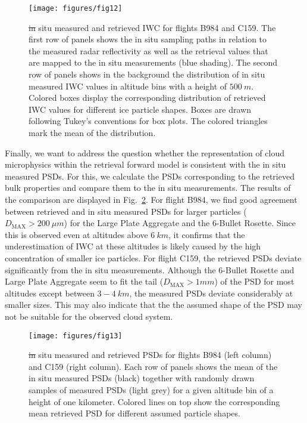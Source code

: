\documentclass[journal abbreviation, manuscript]{copernicus}
\providecommand{\DIFadd}[1]{{\protect\color{blue}\uwave{#1}}} %
\providecommand{\DIFdel}[1]{{\protect\color{red}\sout{#1}}}                      %
\providecommand{\DIFaddFL}[1]{\DIFadd{#1}} %
\providecommand{\DIFdelFL}[1]{\DIFdel{#1}} %
\providecommand{\DIFaddbeginFL}{} %
\providecommand{\DIFaddendFL}{} %
\providecommand{\DIFdelbeginFL}{} %
\providecommand{\DIFdelendFL}{} %
\begin{document}
\begin{figure}[!hbpt]
  \centering
  \texttt{[image: figures/fig12]}
  \caption{\DIFdelbeginFL \DIFdelFL{in }\DIFdelendFL \DIFaddbeginFL \DIFaddFL{In }\DIFaddendFL situ measured and retrieved IWC for flights B984 and C159. The
    first row of panels shows the in situ sampling paths in relation to the
    measured radar reflectivity as well as the retrieval values that are mapped
    to the in situ measurements (blue shading). The second row of panels shows
    in the background the distribution of in situ measured IWC values in
    altitude bins with a height of $500\ \unit{m}$. Colored boxes display the
    corresponding distribution of retrieved IWC values for different ice
    particle shapes. Boxes are drawn following Tukey's conventions for box
    plots. The colored triangles mark the mean of the distribution.}
  \label{fig:in_situ_iwc}
\end{figure}

Finally, we want to address the question whether the representation of cloud
microphysics within the retrieval forward model is consistent with the in situ
measured PSDs. For this, we calculate the PSDs corresponding to the retrieved
bulk properties and compare them to the in situ measurements. The results of the
comparison are displayed in Fig.~\ref{fig:in_situ_psds}. For flight B984, we
find good agreement between retrieved and in situ measured PSDs for larger
particles ($D_\text{MAX} > 200 \ \unit{\mu m}$) for the Large Plate Aggregate
and the 6-Bullet Rosette. Since this is observed even at altitudes above $6
\ \unit{km}$, it confirms that the underestimation of IWC at these altitudes is
likely caused by the high concentration of smaller ice particles. For flight
C159, the retrieved PSDs deviate significantly from the in situ measurements.
Although the 6-Bullet Rosette and Large Plate Aggregate seem to fit the tail
($D_\text{MAX} > 1 \unit{mm}$) of the PSD for most altitudes except between $3 -
4\ \unit{km}$, the measured PSDs deviate considerably at smaller sizes. This may
also indicate that the the assumed shape of the PSD may not be suitable for the
observed cloud system.

\begin{figure}[!hbpt]
  \centering
  \texttt{[image: figures/fig13]}
  \caption{\DIFdelbeginFL \DIFdelFL{in }\DIFdelendFL \DIFaddbeginFL \DIFaddFL{In }\DIFaddendFL situ measured and retrieved PSDs for flights B984 (left column)
    and C159 (right column). Each row of panels shows the mean of the
    in situ measured PSDs (black) together with randomly drawn samples of
    measured PSDs (light grey) for a given altitude bin of a height of one
    kilometer. Colored lines on top show the corresponding mean retrieved PSD
    for different assumed particle shapes.}
  \label{fig:in_situ_psds}
\end{figure}
\end{document}
